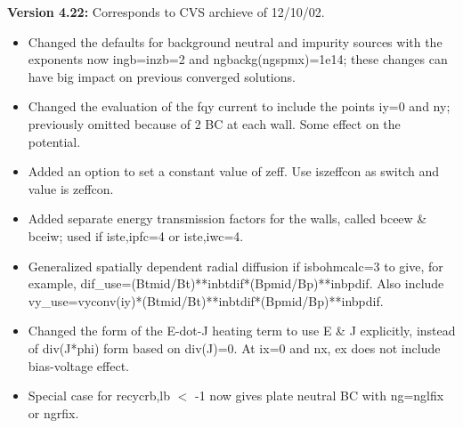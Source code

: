 \documentclass [12pt]{article}
\begin{document}
\noindent\textbf{Version 4.22:} Corresponds to CVS archieve of 12/10/02.
\begin{itemize}
  \item Changed the defaults for background neutral and impurity
          sources with the exponents now ingb=inzb=2 and
          ngbackg(ngspmx)=1e14; these changes can have big impact
          on previous converged solutions.
  \item Changed the evaluation of the fqy current to include the
          points iy=0 and ny; previously omitted because of 2 BC at
          each wall. Some effect on the potential.
  \item Added an option to set a constant value of zeff.  Use
          iszeffcon as switch and value is zeffcon.
  \item Added separate energy transmission factors for the walls,
          called bceew \& bceiw; used if iste,ipfc=4 or iste,iwc=4.
  \item Generalized spatially dependent radial diffusion if 
          isbohmcalc=3 to give, for example,
          dif\_use=(Btmid/Bt)**inbtdif*(Bpmid/Bp)**inbpdif.
          Also include \hfil \break 
          vy\_use=vyconv(iy)*(Btmid/Bt)**inbtdif*(Bpmid/Bp)**inbpdif.
  \item Changed the form of the E-dot-J heating term to use E \& J
          explicitly, instead of div(J*phi) form based on div(J)=0.
          At ix=0 and nx, ex does not include bias-voltage effect.
  \item Special case for recycrb,lb $<$ -1 now gives plate neutral BC
          with ng=nglfix or ngrfix.
\end{itemize}
\end{document}
